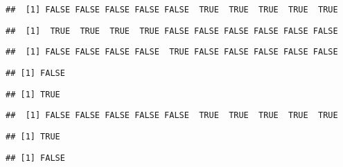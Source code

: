 \documentclass[krantz2]{krantz}\usepackage{knitr}
\begin{document}
\begin{knitrout}\footnotesize
{}\color{fgcolor}\begin{kframe}
\begin{alltt}
 \hlkwb{<-} \hlopt{:}
 \hlopt{>} 
\end{alltt}
\begin{verbatim}
##  [1] FALSE FALSE FALSE FALSE FALSE  TRUE  TRUE  TRUE  TRUE  TRUE
\end{verbatim}
\begin{alltt}
 \hlopt{<} 
\end{alltt}
\begin{verbatim}
##  [1]  TRUE  TRUE  TRUE  TRUE FALSE FALSE FALSE FALSE FALSE FALSE
\end{verbatim}
\begin{alltt}
 \hlopt{==} 
\end{alltt}
\begin{verbatim}
##  [1] FALSE FALSE FALSE FALSE  TRUE FALSE FALSE FALSE FALSE FALSE
\end{verbatim}
\begin{alltt}
 \hlopt{>} \hlstd{)}
\end{alltt}
\begin{verbatim}
## [1] FALSE
\end{verbatim}
\begin{alltt}
 \hlopt{>} \hlstd{)}
\end{alltt}
\begin{verbatim}
## [1] TRUE
\end{verbatim}
\begin{alltt}
 \hlkwb{<-}  \hlopt{>} 
\end{alltt}
\begin{verbatim}
##  [1] FALSE FALSE FALSE FALSE FALSE  TRUE  TRUE  TRUE  TRUE  TRUE
\end{verbatim}
\begin{alltt}
\end{alltt}
\begin{verbatim}
## [1] TRUE
\end{verbatim}
\begin{alltt}
\end{alltt}
\begin{verbatim}
## [1] FALSE
\end{verbatim}
\end{kframe}
\end{knitrout}
\end{document}
